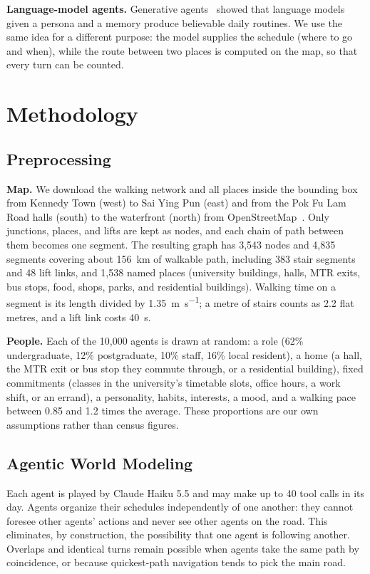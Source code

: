 \documentclass[9pt]{ieeeconf}
\begin{document}
\textbf{Language-model agents.} Generative agents~\cite{park2023generative} showed that language models given a persona and a memory produce believable daily routines. We use the same idea for a different purpose: the model supplies the schedule (where to go and when), while the route between two places is computed on the map, so that every turn can be counted.

\section{Methodology}
\label{sec:method}
\subsection{Preprocessing}
\label{sec:prep}
\textbf{Map.} We download the walking network and all places inside the bounding box from Kennedy Town (west) to Sai Ying Pun (east) and from the Pok Fu Lam Road halls (south) to the waterfront (north) from OpenStreetMap~\cite{osm}. Only junctions, places, and lifts are kept as nodes, and each chain of path between them becomes one segment. The resulting graph has 3,543 nodes and 4,835 segments covering about 156~km of walkable path, including 383 stair segments and 48 lift links, and 1,538 named places (university buildings, halls, MTR exits, bus stops, food, shops, parks, and residential buildings). Walking time on a segment is its length divided by \SI{1.35}{\metre\per\second}; a metre of stairs counts as 2.2 flat metres, and a lift link costs \SI{40}{\second}.

\textbf{People.} Each of the 10,000 agents is drawn at random: a role (62\% undergraduate, 12\% postgraduate, 10\% staff, 16\% local resident), a home (a hall, the MTR exit or bus stop they commute through, or a residential building), fixed commitments (classes in the university's timetable slots, office hours, a work shift, or an errand), a personality, habits, interests, a mood, and a walking pace between 0.85 and 1.2 times the average. These proportions are our own assumptions rather than census figures.

\subsection{Agentic World Modeling}
\label{sec:agents}
Each agent is played by Claude Haiku 5.5 and may make up to 40 tool calls in its day. Agents organize their schedules independently of one another: they cannot foresee other agents' actions and never see other agents on the road. This eliminates, by construction, the possibility that one agent is following another. Overlaps and identical turns remain possible when agents take the same path by coincidence, or because quickest-path navigation tends to pick the main road.
\end{document}
